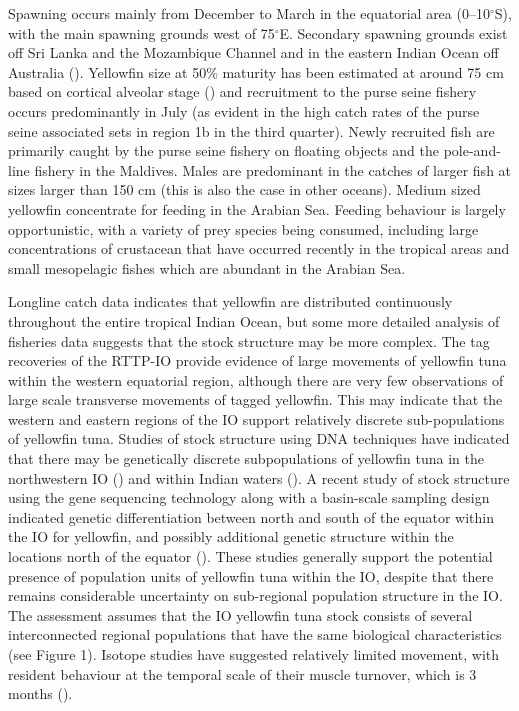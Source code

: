 \documentclass[
]{scrartcl}
\begin{document}
Spawning occurs mainly from December to March in the equatorial area
(0--10\(^\circ\)S), with the main spawning grounds west of
75\(^\circ\)E. Secondary spawning grounds exist off Sri Lanka and the
Mozambique Channel and in the eastern Indian Ocean off Australia
(). Yellowfin
size at 50\% maturity has been estimated at around 75 cm based on
cortical alveolar stage
() and recruitment to the purse seine fishery occurs predominantly
in July (as evident in the high catch rates of the purse seine
associated sets in region 1b in the third quarter). Newly recruited fish
are primarily caught by the purse seine fishery on floating objects and
the pole-and-line fishery in the Maldives. Males are predominant in the
catches of larger fish at sizes larger than 150 cm (this is also the
case in other oceans). Medium sized yellowfin concentrate for feeding in
the Arabian Sea. Feeding behaviour is largely opportunistic, with a
variety of prey species being consumed, including large concentrations
of crustacean that have occurred recently in the tropical areas and
small mesopelagic fishes which are abundant in the Arabian Sea.

Longline catch data indicates that yellowfin are distributed
continuously throughout the entire tropical Indian Ocean, but some more
detailed analysis of fisheries data suggests that the stock structure
may be more complex. The tag recoveries of the RTTP-IO provide evidence
of large movements of yellowfin tuna within the western equatorial
region, although there are very few observations of large scale
transverse movements of tagged yellowfin. This may indicate that the
western and eastern regions of the IO support relatively discrete
sub-populations of yellowfin tuna. Studies of stock structure using DNA
techniques have indicated that there may be genetically discrete
subpopulations of yellowfin tuna in the northwestern IO
() and within Indian waters
(). A
recent study of stock structure using the gene sequencing technology
along with a basin-scale sampling design indicated genetic
differentiation between north and south of the equator within the IO for
yellowfin, and possibly additional genetic structure within the
locations north of the equator
(). These studies generally support the potential presence of
population units of yellowfin tuna within the IO, despite that there
remains considerable uncertainty on sub-regional population structure in
the IO. The assessment assumes that the IO yellowfin tuna stock consists
of several interconnected regional populations that have the same
biological characteristics (see Figure 1). Isotope studies have
suggested relatively limited movement, with resident behaviour at the
temporal scale of their muscle turnover, which is 3 months
().
\end{document}
